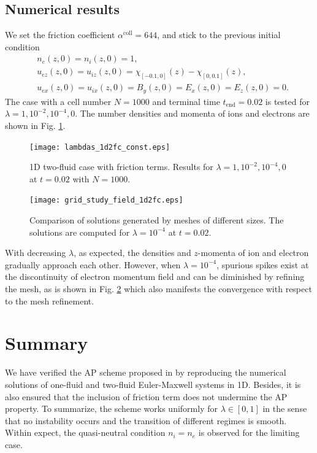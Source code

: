 \documentclass{report}
\begin{document}
\subsection{Numerical results}
We set the friction coefficient $\alpha^\text{coll} = 644$, and stick to the previous initial condition
\begin{align*}
    & n_e(z,0) = n_i(z,0) = 1,\\
    & u_{ez}(z,0) = u_{iz}(z,0) = \chi_{[-0.1,0]}(z) - \chi_{[0,0.1]}(z), \\
    & u_{ex}(z,0) = u_{ix}(z,0) = B_y(z,0) = E_x(z,0) = E_z(z,0) = 0.
\end{align*}
The case with a cell number $N = 1000$ and terminal time $t_{\text{end}} = 0.02$ is tested for $\lambda = 1, 10^{-2}, 10^{-4}, 0$. The number densities and momenta of ions and electrons are shown in Fig. \ref{fig:lambdas_1d2fc}.
\begin{figure}
    \centering
    \texttt{[image: lambdas\_1d2fc\_const.eps]}
    \caption{1D two-fluid case with friction terms. Results for $\lambda = 1, 10^{-2}, 10^{-4}, 0$ at $t = 0.02$ with $N = 1000$.}
    \label{fig:lambdas_1d2fc}
\end{figure}
\begin{figure}
    \centering
    \texttt{[image: grid\_study\_field\_1d2fc.eps]}
    \caption{Comparison of solutions generated by meshes of different sizes. The solutions are computed for $\lambda = 10^{-4}$ at $t = 0.02$.}
    \label{fig:grid_study_field_1d2fc}
\end{figure}
With decreasing $\lambda$, as expected, the densities and $z$-momenta of ion and electron gradually approach each other. However, when $\lambda = 10^{-4}$, spurious spikes exist at the discontinuity of electron momentum field and can be diminished by refining the mesh, as is shown in Fig. \ref{fig:grid_study_field_1d2fc} which also manifests the convergence with respect to the mesh refinement.
\section{Summary}
We have verified the AP scheme proposed in \cite{degond_2012} by reproducing the numerical solutions of one-fluid and two-fluid Euler-Maxwell systems in 1D. Besides, it is also ensured that the inclusion of friction term does not undermine the AP property. To summarize, the scheme works uniformly for $\lambda \in [0,1]$ in the sense that no instability occurs and the transition of different regimes is smooth. Within expect, the quasi-neutral condition $n_i = n_e$ is observed for the limiting case.
\end{document}
